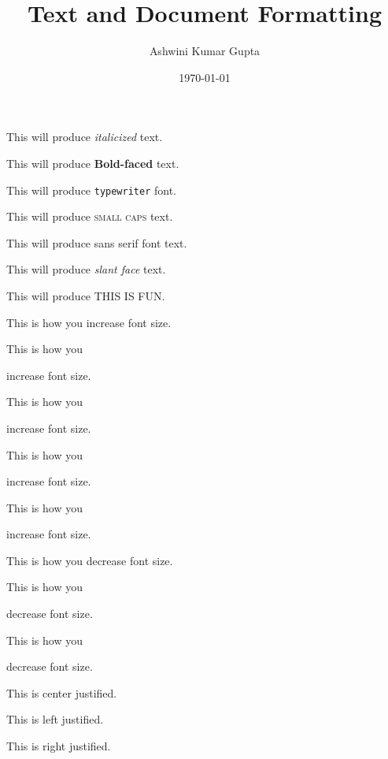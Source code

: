 \documentclass[10pt]{article}
\begin{document}
\tableofcontents

\title{Text and Document Formatting}
\author{Ashwini Kumar Gupta}
\date{\today}
\maketitle

This will produce \textit{italicized} text.

This will produce \textbf{Bold-faced} text.

This will produce \texttt{typewriter} font.

This will produce \textsc{small caps} text.

This will produce \textsf{sans serif font} text.

This will produce \textsl{slant face} text.

This will produce \uppercase{this is fun}.

This is how you increase font size.

This is how you \begin{large} increase font size.\end{large}

This is how you \begin{Large} increase font size.\end{Large}

This is how you \begin{huge} increase font size.\end{huge}

This is how you \begin{Huge} increase font size.\end{Huge}

This is how you decrease font size.

This is how you \begin{small} decrease font size.\end{small}

This is how you \begin{tiny} decrease font size. \end{tiny}

\begin{center}This is center justified. \end{center}

\begin{flushleft}This is left justified. \end{flushleft}

\begin{flushright}This is right justified. \end{flushright}
\end{document}

